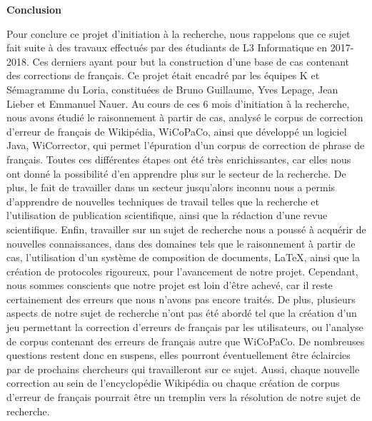 \documentclass[11pt]{article}
\begin{document}
\cleardoublepage
\begin{center}
{\bfseries \huge Conclusion}
\end{center}
\vspace*{35mm}
Pour conclure ce projet d'initiation \`{a} la recherche, nous rappelons que ce sujet fait suite \`{a} des travaux effectu\'{e}s par des \'{e}tudiants de L3 Informatique en 2017-2018. Ces derniers ayant pour but la construction d'une base de cas contenant des corrections de fran\c{c}ais. Ce projet \'{e}tait encadr\'{e} par les \'{e}quipes K et S\'{e}magramme du Loria, constitu\'{e}es de Bruno Guillaume, Yves Lepage, Jean Lieber et Emmanuel Nauer.
\newline
\newline
	Au cours de ces 6 mois d'initiation \`{a} la recherche, nous avons \'{e}tudi\'{e} le raisonnement \`{a} partir de cas, analys\'{e} le corpus de correction d'erreur de fran\c{c}ais de Wikip\'{e}dia, WiCoPaCo, ainsi que d\'{e}velopp\'{e} un logiciel Java, WiCorrector, qui permet l'\'{e}puration d'un corpus de correction de phrase de fran\c{c}ais. Toutes ces diff\'{e}rentes \'{e}tapes ont \'{e}t\'{e} tr\`{e}s enrichissantes, car elles nous ont donn\'{e} la possibilit\'{e} d'en apprendre plus sur le secteur de la recherche. De plus, le fait de travailler dans un secteur jusqu'alors inconnu nous a permis d'apprendre de nouvelles techniques de travail telles que la recherche et l'utilisation de publication scientifique, ainsi que la r\'{e}daction d'une revue scientifique. Enfin, travailler sur un sujet de recherche nous a pouss\'{e} \`{a} acqu\'{e}rir de nouvelles connaissances, dans des domaines tels que le raisonnement \`{a} partir de cas, l'utilisation d'un syst\`{e}me de composition de documents, LaTeX, ainsi que la cr\'{e}ation de protocoles rigoureux, pour l'avancement de notre projet.
\newline
\newline
	Cependant, nous sommes conscients que notre projet est loin d'\^{e}tre achev\'{e}, car il reste certainement des erreurs que nous n'avons pas encore trait\'{e}s. De plus, plusieurs aspects de notre sujet de recherche n'ont pas \'{e}t\'{e} abord\'{e} tel que la cr\'{e}ation d'un jeu permettant la correction d'erreurs de fran\c{c}ais par les utilisateurs, ou l'analyse de corpus contenant des erreurs de fran\c{c}ais autre que WiCoPaCo. De nombreuses questions restent donc en suspens, elles pourront \'{e}ventuellement \^{e}tre \'{e}claircies par de prochains chercheurs qui travailleront sur ce sujet. Aussi, chaque nouvelle correction au sein de l'encyclop\'{e}die Wikip\'{e}dia ou chaque cr\'{e}ation de corpus d'erreur de fran\c{c}ais pourrait \^{e}tre un tremplin vers la r\'{e}solution de notre sujet de recherche.
\end{document}
